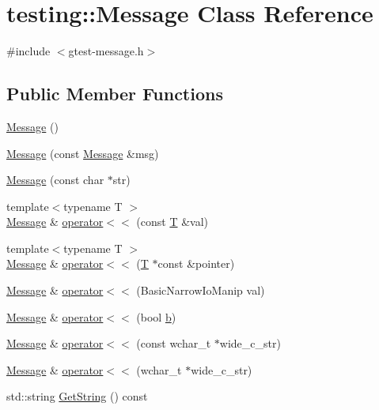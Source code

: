 \hypertarget{classtesting_1_1_message}{}\section{testing\+:\+:Message Class Reference}
\label{classtesting_1_1_message}


{\ttfamily \#include $<$gtest-\/message.\+h$>$}

\subsection*{Public Member Functions}
\begin{DoxyCompactItemize}
\item 
\hyperlink{classtesting_1_1_message_af5ba7216630df9845f18feb64b1a5383}{Message} ()
\item 
\hyperlink{classtesting_1_1_message_ac126e24804817a053bebba0920d94a11}{Message} (const \hyperlink{classtesting_1_1_message}{Message} \&msg)
\item 
\hyperlink{classtesting_1_1_message_a9de694ca239486809fc99fbbea8ac21d}{Message} (const char $\ast$str)
\item 
{\footnotesize template$<$typename T $>$ }\\\hyperlink{classtesting_1_1_message}{Message} \& \hyperlink{classtesting_1_1_message_a2e0e71be52d54c20a75a55fca812721f}{operator$<$$<$} (const \hyperlink{functions__7_8js_adf1f3edb9115acb0a1e04209b7a9937b}{T} \&val)
\item 
{\footnotesize template$<$typename T $>$ }\\\hyperlink{classtesting_1_1_message}{Message} \& \hyperlink{classtesting_1_1_message_aa3ab685879958f90d2d8cd5b68d10c34}{operator$<$$<$} (\hyperlink{functions__7_8js_adf1f3edb9115acb0a1e04209b7a9937b}{T} $\ast$const \&pointer)
\item 
\hyperlink{classtesting_1_1_message}{Message} \& \hyperlink{classtesting_1_1_message_a3a71a1c1c8ea52de5852d75483d41453}{operator$<$$<$} (Basic\+Narrow\+Io\+Manip val)
\item 
\hyperlink{classtesting_1_1_message}{Message} \& \hyperlink{classtesting_1_1_message_a3e1e04f23b1bdfe18adfd59928296346}{operator$<$$<$} (bool \hyperlink{jquery_8js_a2fa551895933fae935a0a6b87282241d}{b})
\item 
\hyperlink{classtesting_1_1_message}{Message} \& \hyperlink{classtesting_1_1_message_ac0db9c22535b28bc863bfd0a1fdf7e14}{operator$<$$<$} (const wchar\+\_\+t $\ast$wide\+\_\+c\+\_\+str)
\item 
\hyperlink{classtesting_1_1_message}{Message} \& \hyperlink{classtesting_1_1_message_ac1d3a041ac4bb9c929ee746b31a13d6a}{operator$<$$<$} (wchar\+\_\+t $\ast$wide\+\_\+c\+\_\+str)
\item 
std\+::string \hyperlink{classtesting_1_1_message_abe8c1b7584aa670dd0e2413e8317a937}{Get\+String} () const 
\end{DoxyCompactItemize}


